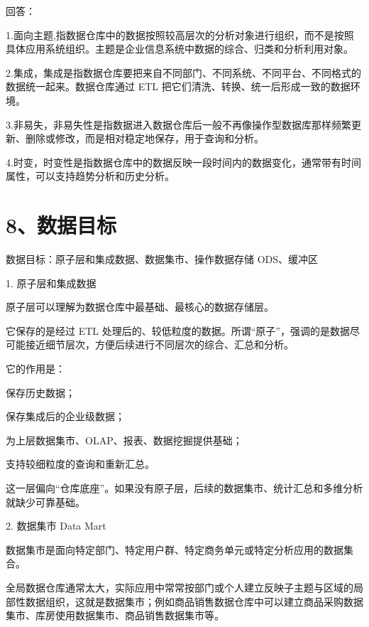 \documentclass[UTF8,zihao=-4]{ctexart}
\begin{document}
回答：\par
1.面向主题,指数据仓库中的数据按照较高层次的分析对象进行组织，而不是按照具体应用系统组织。主题是企业信息系统中数据的综合、归类和分析利用对象。\par
2.集成，集成是指数据仓库要把来自不同部门、不同系统、不同平台、不同格式的数据统一起来。数据仓库通过 ETL 把它们清洗、转换、统一后形成一致的数据环境。\par
3.非易失，非易失性是指数据进入数据仓库后一般不再像操作型数据库那样频繁更新、删除或修改，而是相对稳定地保存，用于查询和分析。\par
4.时变，时变性是指数据仓库中的数据反映一段时间内的数据变化，通常带有时间属性，可以支持趋势分析和历史分析。\par

\newpage
\section*{8、数据目标}

数据目标：原子层和集成数据、数据集市、操作数据存储 ODS、缓冲区\par

1. 原子层和集成数据\par

原子层可以理解为数据仓库中最基础、最核心的数据存储层。\par

它保存的是经过 ETL 处理后的、较低粒度的数据。所谓“原子”，强调的是数据尽可能接近细节层次，方便后续进行不同层次的综合、汇总和分析。\par

它的作用是：\par

保存历史数据；\par
保存集成后的企业级数据；\par
为上层数据集市、OLAP、报表、数据挖掘提供基础；\par
支持较细粒度的查询和重新汇总。\par

这一层偏向“仓库底座”。如果没有原子层，后续的数据集市、统计汇总和多维分析就缺少可靠基础。\par

2. 数据集市 Data Mart\par

数据集市是面向特定部门、特定用户群、特定商务单元或特定分析应用的数据集合。\par

全局数据仓库通常太大，实际应用中常常按部门或个人建立反映子主题与区域的局部性数据组织，这就是数据集市；例如商品销售数据仓库中可以建立商品采购数据集市、库房使用数据集市、商品销售数据集市等。\par
\end{document}
